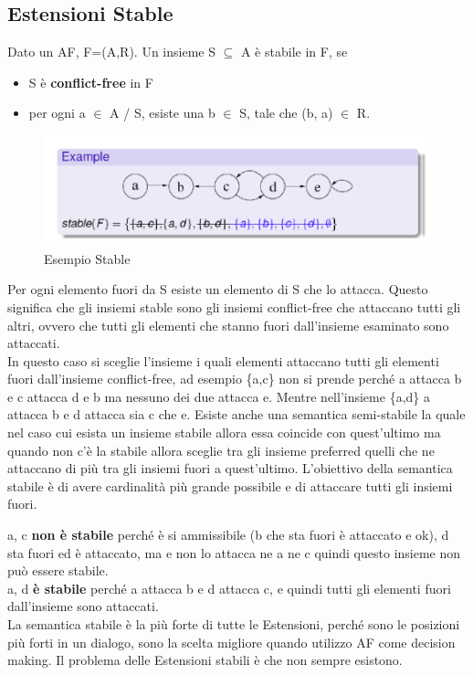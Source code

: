 \subsection{Estensioni Stable}
Dato un AF, F=(A,R). Un insieme S $\subseteq$ A è stabile in F, se
\begin{itemize}
    \item S è \textbf{conflict-free} in F
    \item per ogni a $\in$ A / S, esiste una b $\in$ S, tale che (b, a) $\in$ R.
\end{itemize}
\begin{figure}[htp]
    \centering
    \includegraphics[width=12cm, keepaspectratio]{img/Cap6/stable.png}
    \caption{Esempio Stable}
\end{figure}
Per ogni elemento fuori da S esiste un elemento di S che lo attacca. Questo
significa che gli insiemi stable sono gli insiemi conflict-free che attaccano
tutti gli altri, ovvero che tutti gli elementi che stanno fuori dall'insieme
esaminato sono attaccati.\\
In questo caso si sceglie l'insieme i quali elementi attaccano tutti gli
elementi fuori dall'insieme conflict-free, ad esempio \{a,c\} non si prende
perché a attacca b e c attacca d e b ma nessuno dei due attacca e. Mentre
nell'insieme \{a,d\} a attacca b e d attacca sia c che e. Esiste anche una
semantica semi-stabile la quale nel caso cui esista un insieme stabile allora
essa coincide con quest'ultimo ma quando non c'è la stabile allora sceglie tra
gli insieme preferred quelli che ne attaccano di più tra gli insiemi fuori a
quest'ultimo. L'obiettivo della semantica stabile è di avere cardinalità più
grande possibile e di attaccare tutti gli insiemi fuori.

\vspace{0.5cm}

\noindent a, c \textbf{non è stabile} perché è si ammissibile (b che sta fuori è
attaccato e ok), d sta fuori ed è attaccato, ma e non lo attacca ne a ne c
quindi questo insieme non può essere stabile. \\a, d \textbf{è stabile} perché a
attacca b e d attacca c, e quindi tutti gli elementi fuori dall'insieme sono
attaccati. \\La semantica stabile è la più forte di tutte le Estensioni, perché
sono le posizioni più forti in un dialogo, sono la scelta migliore quando
utilizzo AF come decision making. Il problema delle Estensioni stabili è che non
sempre esistono.

